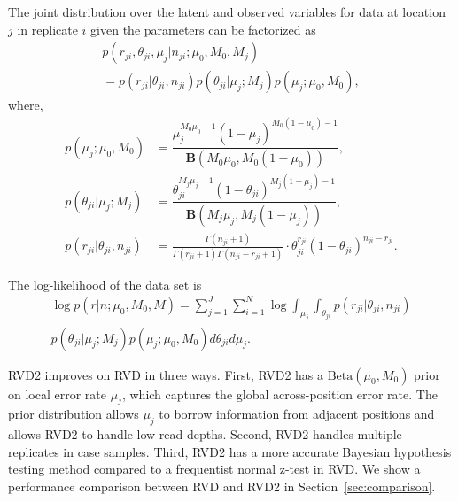 \documentclass{bioinfo}
\begin{document}
The joint distribution over the latent and observed variables for data at location $j$ in replicate $i$ given the parameters can be factorized as
\begin{multline}\label{eqn:jointpdf}
p \left( r_{ji}, \theta_{ji}, \mu_j | n_{ji}; \mu_0, M_0, M_j \right) \\ = p \left( r_{ji} | \theta_{ji}, n_{ji} \right) p\left( \theta_{ji} | \mu_j; M_j \right) p\left( \mu_j; \mu_0, M_0 \right),
\end{multline}
where,
\begin{align}\nonumber
  p\left( \mu_j; \mu_0, M_0 \right)  &= \dfrac{\mu_j^{M_0\mu_0 -1} (1 - \mu_j)^{M_0 ( 1 - \mu_0) - 1}}{\textbf{B}(M_0 \mu_0,M_0 (1-\mu_0) )}, \nonumber \\
  p\left( \theta_{ji} | \mu_j; M_j \right) &= \dfrac{ \theta_{ji}^{M_j\mu_j -1} (1 - \theta_{ji})^{M_j ( 1 - \mu_j) - 1}}{\textbf{B}(M_j \mu_j, M_j (1-\mu_j))}, \nonumber \\
  p\left( r_{ji} | \theta_{ji}, n_{ji} \right) &= \frac{ \Gamma(n_{ji}+1) } { \Gamma(r_{ji}+1) \Gamma( n_{ji} - r_{ji} + 1 ) } \cdot \theta_{ji}^{r_{ji}} (1 - \theta_{ji})^{n_{ji} - r_{ji}}. \nonumber
\end{align}


The log-likelihood of the data set is
\begin{multline}
\log p \left( r | n ; \mu_0, M_0, M \right) = \sum_{j=1}^J \sum_{i=1}^N \log \int_{\mu_j} \int_{\theta_{ji}}  p \left( r_{ji} | \theta_{ji}, n_{ji} \right) \\ p\left( \theta_{ji} | \mu_j; M_j \right) p\left( \mu_j; \mu_0, M_0 \right) d\theta_{ji} d\mu_j.
\end{multline}

\label{Improvement of RVD2}
RVD2 improves on RVD in three ways. First, RVD2 has a $ \text{Beta}(\mu_0, M_0) $ prior on local error rate $ \mu_j $, which captures the global across-position error rate. The prior distribution allows $ \mu_j $ to borrow information from adjacent positions and allows RVD2 to handle low read depths. Second, RVD2 handles multiple replicates in case samples. Third, RVD2 has a more accurate Bayesian hypothesis testing method compared to a frequentist normal z-test in RVD. We show a performance comparison between RVD and RVD2 in Section~\ref{sec:comparison}.
\end{document}
